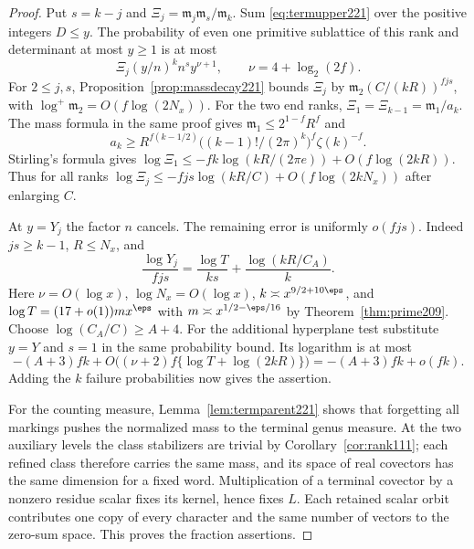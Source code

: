 \documentclass[a4paper,11pt]{article}
\theoremstyle{definition}
\theoremstyle{remark}
\numberwithin{equation}{section}
\begin{document}
\begin{proof}
Put \(s=k-j\) and
\(\Xi_j=\mathfrak m_j\mathfrak m_s/\mathfrak m_k\).
Sum \eqref{eq:termupper221} over the positive integers \(D\le y\).
The probability of even one primitive sublattice of this rank
and determinant at most \(y\ge1\) is at most
\[
           \Xi_j(y/n)^k n^s y^{\nu+1},
                  \qquad \nu=4+\log_2(2f).
\]
For \(2\le j,s\), Proposition~\ref{prop:massdecay221} bounds
\(\Xi_j\) by \(\mathfrak m_2(C/(kR))^{fjs}\), with
\(\log^+\mathfrak m_2=O(f\log(2N_x))\). For the two end ranks,
\(\Xi_1=\Xi_{k-1}=\mathfrak m_1/a_k\). The mass formula in the
same proof gives \(\mathfrak m_1\le 2^{1-f}R^f\) and
\[
 a_k\ge R^{f(k-1/2)}\bigl((k-1)!/(2\pi)^k\bigr)^f\zeta(k)^{-f}.
\]
Stirling's formula gives
\(\log\Xi_1\le-fk\log(kR/(2\pi e))+O(f\log(2kR))\).
Thus for all ranks \(\log\Xi_j\le-fjs\log(kR/C)
+O(f\log(2kN_x))\) after enlarging \(C\).

At \(y=Y_j\) the factor \(n\) cancels. The remaining error is
uniformly \(o(fjs)\). Indeed \(js\ge k-1\), \(R\le N_x\),
and
\[
 \frac{\log Y_j}{fjs}
       =\frac{\log T}{ks}+\frac{\log(kR/C_A)}{k}.
\]
Here \(\nu=O(\log x)\), \(\log N_x=O(\log x)\),
\(k\asymp x^{9/2+10\eps}\), and
\(\log T=(17+o(1))m x^\eps\) with
\(m\asymp x^{1/2-\eps/16}\) by Theorem~\ref{thm:prime209}.
Choose \(\log(C_A/C)\ge A+4\). For the additional hyperplane
test substitute \(y=Y\) and \(s=1\) in the same probability
bound. Its logarithm is at most
\[
 -(A+3)fk+O\bigl((\nu+2)f\{\log T+\log(2kR)\}\bigr)
                 =-(A+3)fk+o(fk).
\]
Adding the \(k\) failure probabilities now gives the assertion.

For the counting measure, Lemma~\ref{lem:termparent221} shows
that forgetting all markings pushes the normalized mass to
the terminal genus measure. At the two auxiliary levels the
class stabilizers are trivial by Corollary~\ref{cor:rank111};
each refined class therefore carries the same mass, and its
space of real covectors has the same dimension for a fixed word.
Multiplication of a terminal covector by a nonzero residue scalar
fixes its kernel, hence fixes \(L\). Each retained scalar orbit
contributes one copy of every character and the same number of
vectors to the zero-sum space. This proves the fraction assertions.
\end{proof}
\end{document}
